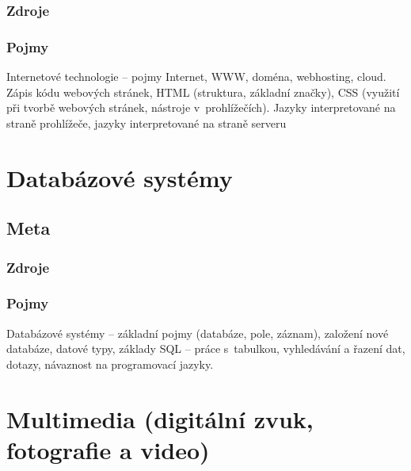 \documentclass[12pt]{article}
\begin{document}
\subsubsection{Zdroje}
\subsubsection{Pojmy}
Internetové technologie – pojmy Internet, WWW, doména, webhosting, cloud. Zápis kódu webových stránek, HTML (struktura, základní značky), CSS (využití při tvorbě webových stránek, nástroje v~prohlížečích). Jazyky interpretované na straně prohlížeče, jazyky interpretované na straně serveru

\section{Databázové systémy}
\subsection{Meta}
\subsubsection{Zdroje}
\subsubsection{Pojmy}
Databázové systémy – základní pojmy (databáze, pole, záznam), založení nové databáze, datové typy, základy SQL – práce s~tabulkou, vyhledávání a řazení dat, dotazy, návaznost na programovací jazyky.

\section{Multimedia (digitální zvuk, fotografie a video)}
\end{document}
